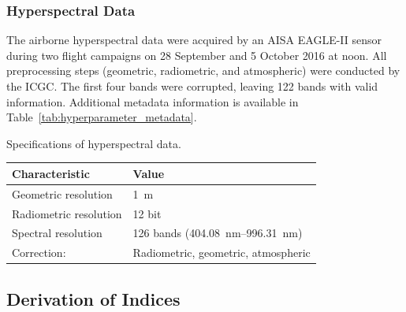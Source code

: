 \documentclass[remotesensing,article,accept,moreauthors,pdftex]{Definitions/mdpi}
\begin{document}
\begin{paracol}{2}
\switchcolumn



\vspace{-12pt}
\subsubsection{Hyperspectral Data}

The airborne hyperspectral data were acquired by an AISA EAGLE-II sensor during two flight campaigns on 28 September and 5 October 2016 at noon.
All preprocessing steps (geometric, radiometric, and atmospheric) were conducted by the \ac{ICGC}.
The first four bands were corrupted, leaving 122 bands with valid information.
Additional metadata information is available in Table~\ref{tab:hyperparameter_metadata}.


\begin{specialtable}[H]
\setlength{\tabcolsep}{11.3mm}
	\caption[t]{Specifications of hyperspectral data.}
	\begingroup
	\begin{tabular}{ll}
	\toprule
		\textbf{Characteristic}         & \textbf{Value}                               \\\midrule

		Geometric resolution   & 1~m                                 \\
		Radiometric resolution & 12 bit                              \\
		Spectral resolution    & 126 bands (404.08~nm--996.31~nm) \\
		Correction:            & Radiometric, geometric, atmospheric\\\bottomrule
	\end{tabular}
	\endgroup\label{tab:hyperparameter_metadata}
\end{specialtable}

\subsection{Derivation of Indices}


\end{paracol}
\end{document}
